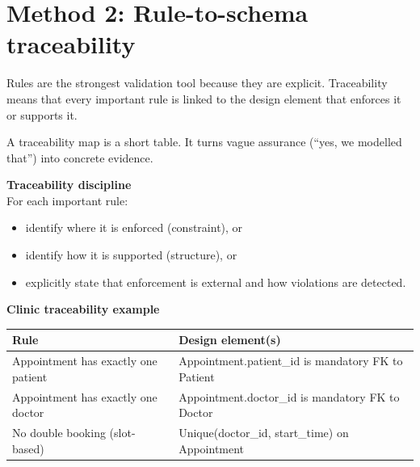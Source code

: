 \section{Method 2: Rule-to-schema traceability}
Rules are the strongest validation tool because they are explicit.
Traceability means that every important rule is linked to the design element that enforces it or supports it.

A traceability map is a short table.
It turns vague assurance (“yes, we modelled that”) into concrete evidence.

\begin{principlebox}
\textbf{Traceability discipline}\\[2pt]
For each important rule:
\begin{itemize}[leftmargin=*,nosep]
  \item identify where it is enforced (constraint), or
  \item identify how it is supported (structure), or
  \item explicitly state that enforcement is external and how violations are detected.
\end{itemize}
\end{principlebox}

\begin{examplebox}
\textbf{Clinic traceability example}\\[4pt]
\begin{tabularx}{\textwidth}{@{}lX@{}}
\toprule
Rule & Design element(s) \\
\midrule
Appointment has exactly one patient & Appointment.patient\_id is mandatory FK to Patient \\
Appointment has exactly one doctor & Appointment.doctor\_id is mandatory FK to Doctor \\
No double booking (slot-based) & Unique(doctor\_id, start\_time) on Appointment \\
\bottomrule
\end{tabularx}
\end{examplebox}

